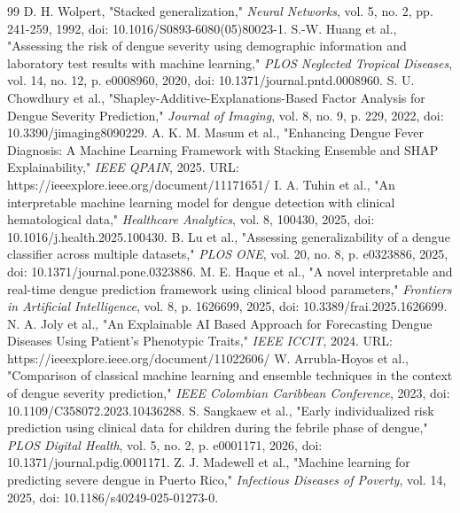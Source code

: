 \documentclass[12pt, a4paper]{report}
\begin{document}
\begin{thebibliography}{99}
 D. H. Wolpert, "Stacked generalization," \textit{Neural Networks}, vol. 5, no. 2, pp. 241-259, 1992, doi: 10.1016/S0893-6080(05)80023-1.
 S.-W. Huang et al., "Assessing the risk of dengue severity using demographic information and laboratory test results with machine learning," \textit{PLOS Neglected Tropical Diseases}, vol. 14, no. 12, p. e0008960, 2020, doi: 10.1371/journal.pntd.0008960.
 S. U. Chowdhury et al., "Shapley-Additive-Explanations-Based Factor Analysis for Dengue Severity Prediction," \textit{Journal of Imaging}, vol. 8, no. 9, p. 229, 2022, doi: 10.3390/jimaging8090229.
 A. K. M. Masum et al., "Enhancing Dengue Fever Diagnosis: A Machine Learning Framework with Stacking Ensemble and SHAP Explainability," \textit{IEEE QPAIN}, 2025. URL: https://ieeexplore.ieee.org/document/11171651/
 I. A. Tuhin et al., "An interpretable machine learning model for dengue detection with clinical hematological data," \textit{Healthcare Analytics}, vol. 8, 100430, 2025, doi: 10.1016/j.health.2025.100430.
 B. Lu et al., "Assessing generalizability of a dengue classifier across multiple datasets," \textit{PLOS ONE}, vol. 20, no. 8, p. e0323886, 2025, doi: 10.1371/journal.pone.0323886.
 M. E. Haque et al., "A novel interpretable and real-time dengue prediction framework using clinical blood parameters," \textit{Frontiers in Artificial Intelligence}, vol. 8, p. 1626699, 2025, doi: 10.3389/frai.2025.1626699.
 N. A. Joly et al., "An Explainable AI Based Approach for Forecasting Dengue Diseases Using Patient's Phenotypic Traits," \textit{IEEE ICCIT}, 2024. URL: https://ieeexplore.ieee.org/document/11022606/
 W. Arrubla-Hoyos et al., "Comparison of classical machine learning and ensemble techniques in the context of dengue severity prediction," \textit{IEEE Colombian Caribbean Conference}, 2023, doi: 10.1109/C358072.2023.10436288.
 S. Sangkaew et al., "Early individualized risk prediction using clinical data for children during the febrile phase of dengue," \textit{PLOS Digital Health}, vol. 5, no. 2, p. e0001171, 2026, doi: 10.1371/journal.pdig.0001171.
 Z. J. Madewell et al., "Machine learning for predicting severe dengue in Puerto Rico," \textit{Infectious Diseases of Poverty}, vol. 14, 2025, doi: 10.1186/s40249-025-01273-0.
\end{thebibliography}
\end{document}
